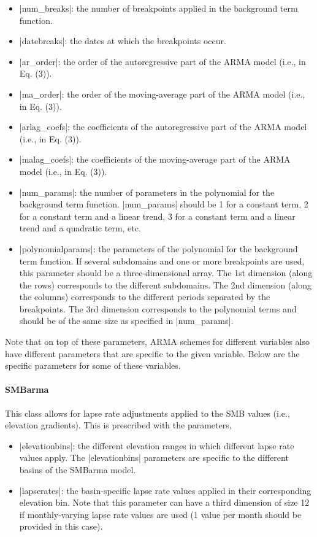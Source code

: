 \begin{itemize}
	\item \lstinlinebg|num_breaks|: the number of breakpoints applied in the background term function.
	\item \lstinlinebg|datebreaks|: the dates at which the breakpoints occur.
	\item \lstinlinebg|ar_order|: the order of the autoregressive part of the ARMA model (i.e., in Eq. (3)).
	\item \lstinlinebg|ma_order|: the order of the moving-average part of the ARMA model (i.e., in Eq. (3)).
		\item \lstinlinebg|arlag_coefs|: the coefficients of the autoregressive part of the ARMA model (i.e., in Eq. (3)).
		\item \lstinlinebg|malag_coefs|: the coefficients of the moving-average part of the ARMA model (i.e., in Eq. (3)).
		\item \lstinlinebg|num_params|: the number of parameters in the polynomial for the background term function. \lstinlinebg|num_params| should be 1 for a constant term, 2 for a constant term and a linear trend, 3 for a constant term and a linear trend and a quadratic term, etc.
		\item \lstinlinebg|polynomialparams|: the parameters of the polynomial for the background term function. If several subdomains and one or more breakpoints are used, this parameter should be a three-dimensional array. The 1st dimension (along the rows) corresponds to the different subdomains. The 2nd dimension (along the columns) corresponds to the different periods separated by the breakpoints. The 3rd dimension corresponds to the polynomial terms and should be of the same size as specified in \lstinlinebg|num_params|.
\end{itemize}
Note that on top of these parameters, ARMA schemes for different variables also have different parameters that are specific to the given variable. Below are the specific parameters for some of these variables.

\paragraph{SMBarma}
This class allows for lapse rate adjustments applied to the SMB values (i.e., elevation gradients). This is prescribed with the parameters,
\begin{itemize}
	\item \lstinlinebg|elevationbins|: the different elevation ranges in which different lapse rate values apply. The \lstinlinebg|elevationbins| parameters are specific to the different basins of the SMBarma model.
	\item \lstinlinebg|lapserates|: the basin-specific lapse rate values applied in their corresponding elevation bin. Note that this parameter can have a third dimension of size 12 if monthly-varying lapse rate values are used (1 value per month should be provided in this case).
\end{itemize}


